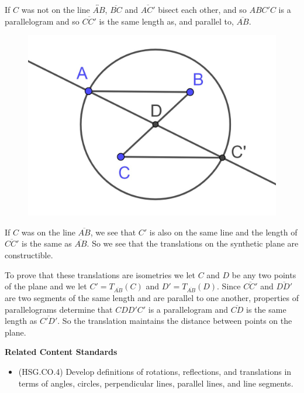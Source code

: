 \documentclass[
]{book}
\providecommand{\tightlist}{%
  \setlength{\itemsep}{0pt}\setlength{\parskip}{0pt}}
\newenvironment{standards}{}{}
\theoremstyle{definition}
\theoremstyle{definition}
\theoremstyle{definition}
\theoremstyle{definition}
\theoremstyle{remark}
\begin{document}
If \(C\) was not on the line \(\overleftrightarrow{AB}\), \(\overline{BC}\) and \(\overline{AC'}\) bisect each other, and so \(ABC'C\) is a parallelogram and so \(\overline{CC'}\) is the same length as, and parallel to, \(\overline{AB}\).

\begin{figure}

{\centering \includegraphics[width=0.35\linewidth]{images/Translation_synthetic} 

}

\end{figure}

If \(C\) was on the line \(\overline{AB}\), we see that \(C'\) is also on the same line and the length of \(\overline{CC'}\) is the same as \(\overline{AB}\). So we see that the translations on the synthetic plane are constructible.

To prove that these translations are isometries we let \(C\) and \(D\) be any two points of the plane and we let \(C'=T_{\overline{AB}}(C)\) and \(D'=T_{\overline{AB}}(D)\). Since \(\overline{CC'}\) and \(\overline{DD'}\) are two segments of the same length and are parallel to one another, properties of parallelograms determine that \(CDD'C'\) is a parallelogram and \(\overline{CD}\) is the same length as \(\overline{C'D'}\). So the translation maintains the distance between points on the plane.

\begin{standards}

\begin{center}
\textbf{Related Content Standards}

\end{center}

\begin{itemize}
\tightlist
\item
  (HSG.CO.4) Develop definitions of rotations, reflections, and translations in terms of angles, circles, perpendicular lines, parallel lines, and line segments.
\end{itemize}

\end{standards}
\end{document}
